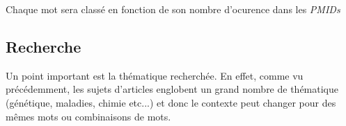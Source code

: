 Chaque mot sera classé en fonction de son nombre d'ocurence dans les \textit{PMIDs}


\subsection{Recherche}
Un point important est la thématique recherchée. En effet, comme vu précédemment, les sujets d'articles englobent un grand nombre de thématique (génétique, maladies, chimie etc...) et donc le contexte peut changer pour des mêmes mots ou combinaisons de mots.